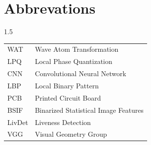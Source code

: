 \chapter*{Abbrevations}
\begin{spacing}{1.5}
\indent
\begin{tabular}{ll}
 WAT & Wave Atom Transformation \\
 LPQ &  Local Phase Quantization \\
 CNN & Convolutional Neural Network \\
 LBP & Local Binary Pattern \\
 PCB & Printed Circuit Board\\
 BSIF & Binarized Statistical Image Features \\
 LivDet & Liveness Detection\\
 VGG & Visual Geometry Group \
\end{tabular}   
\end{spacing}



